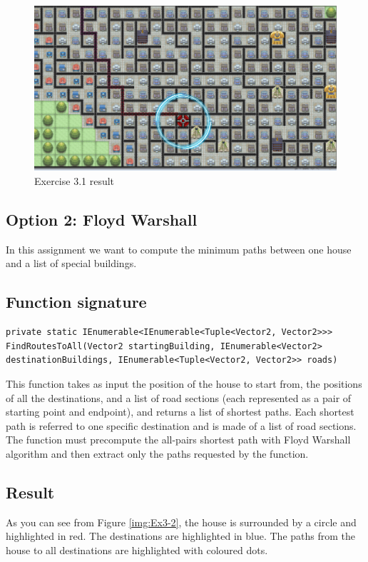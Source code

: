 \documentclass[10pt,a4paper]{article}
\begin{document}
\begin{figure}
\centering
\includegraphics[scale=0.2]{img/exercise3}
\caption{Exercise 3.1 result}
\label{img:Ex3-1}
\end{figure}


\subsection*{Option 2: Floyd Warshall}
In this assignment we want to compute the minimum paths between one house and a list of special buildings. 

\subsection*{Function signature} 
\begin{lstlisting}
private static IEnumerable<IEnumerable<Tuple<Vector2, Vector2>>> FindRoutesToAll(Vector2 startingBuilding, IEnumerable<Vector2> destinationBuildings, IEnumerable<Tuple<Vector2, Vector2>> roads)
\end{lstlisting}

\noindent
This function takes as input the position of the house to start from, the positions of all the destinations, and a list of road sections (each represented as a pair of starting point and endpoint), and returns a list of shortest paths. Each shortest path is referred to one specific destination and is made of a list of road sections.
The function must precompute the all-pairs shortest path with Floyd Warshall algorithm and then extract only the paths requested by the function.\\

\subsection*{Result}
As you can see from Figure \ref{img:Ex3-2}, the house is surrounded by a circle and highlighted in red. The destinations are highlighted in blue. The paths from the house to all destinations are highlighted with coloured dots.
\end{document}
